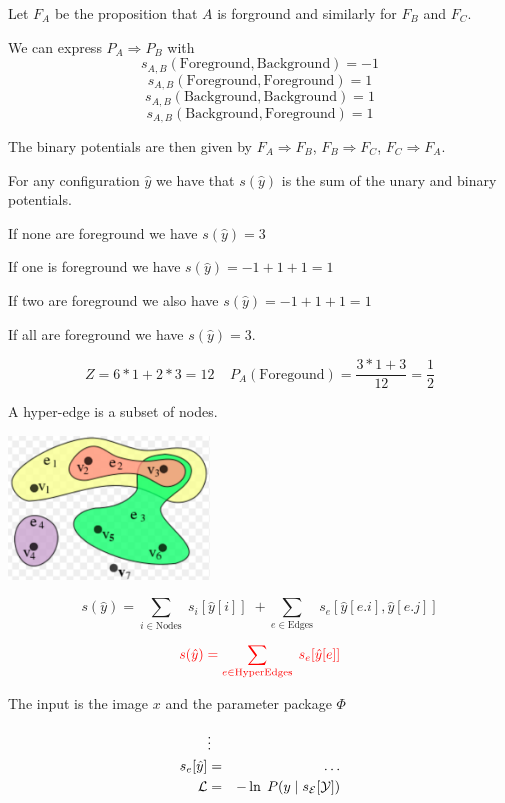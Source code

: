 {\vfill
Let $F_A$ be the proposition that $A$ is forground and similarly for $F_B$ and $F_C$.

\vfill
We can express $P_A \Rightarrow P_B$ with
$$s_{A,B}(\mathrm{Foreground},\mathrm{Background}) = -1$$
$$s_{A,B}(\mathrm{Foreground},\mathrm{Foreground}) = 1$$
$$s_{A,B}(\mathrm{Background},\mathrm{Background}) = 1$$
$$s_{A,B}(\mathrm{Background},\mathrm{Foreground}) = 1$$

\vfill
The binary potentials are then given by
$F_A \Rightarrow F_B$, $F_B \Rightarrow F_C$, $F_C \Rightarrow F_A$.


For any configuration $\hat{y}$ we have that $s(\hat{y})$ is the sum of the unary and binary potentials.

\vfill
If none are foreground we have $s(\hat{y}) = 3$

\vfill
If one is foreground we have $s(\hat{y}) = -1 + 1+ 1 = 1$

\vfill
If two are foreground we also have $s(\hat{y}) = -1 + 1+ 1 = 1$

\vfill
If all are foreground we have $s(\hat{y}) = 3$.

\vfill
$$Z = 6*1 + 2*3 = 12\;\;\;\;P_A(\mathrm{Foregound}) = \frac{3*1 + 3}{12} = \frac{1}{2}$$


A hyper-edge is a subset of nodes.

\vfill
\centerline{\includegraphics[height = 1.5in]{../images/HyperGraph}}


$$s(\hat{y}) = \sum_{i \in \mathrm{Nodes}}\; s_i[\hat{y}[i]]\; + \sum_{e \in \mathrm{Edges}}\;s_e[\hat{y}[e.i],\hat{y}[e.j]]$$

\vfill

$${\color{red} s(\hat{y}) = \sum_{e \in \mathrm{HyperEdges}}  \; s_e[\hat{y}[e]]}$$



The input is the image $x$ and the parameter package $\Phi$

\begin{eqnarray*}
 & \vdots & \\
s_e[\hat{y}] & = & \ldots \\
{\cal L} & = & - \ln\; P(y\;|\;s_{\cal E}[{\cal Y}])
\end{eqnarray*}

}

